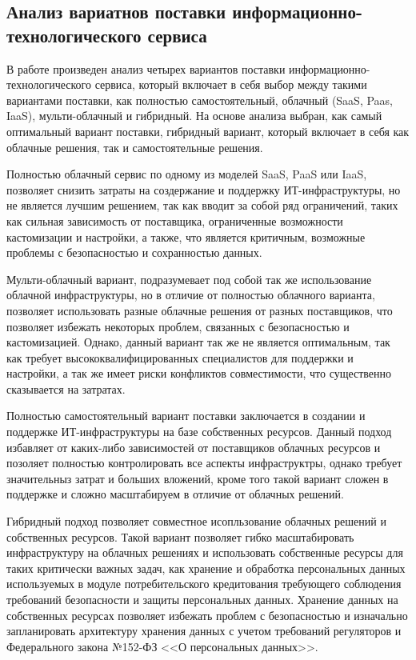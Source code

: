 \documentclass[14pt, a4paper]{extarticle}
\begin{document}
\subsection{Анализ вариатнов поставки информационно-технологического сервиса}

В работе произведен анализ четырех вариантов поставки
информационно-технологического сервиса, который включает в себя выбор между
такими вариантами поставки, как полностью самостоятельный, облачный (SaaS, Paas, IaaS),
мульти-облачный и гибридный. На основе анализа выбран, как самый оптимальный вариант
поставки, гибридный вариант, который включает в себя как облачные решения, так и
самостоятельные решения.

Полностью облачный сервис \cite{micrasoft-azure-book} по одному из моделей SaaS,
PaaS или IaaS, позволяет снизить затраты на создержание и поддержку ИТ-инфраструктуры,
но не является лучшим решением, так как вводит за собой ряд ограничений, таких как
сильная зависимость от поставщика, ограниченные возможности кастомизации и настройки,
а также, что является критичным, возможные проблемы с безопасностью и сохранностью данных.

Мульти-облачный вариант, подразумевает под собой так же использование облачной
инфраструктуры, но в отличие от полностью облачного варианта, позволяет использовать
разные облачные решения от разных поставщиков, что позволяет избежать
некоторых проблем, связанных с безопасностью и кастомизацией. Однако, данный
вариант так же не является оптимальным, так как требует высококвалифицированных
специалистов для поддержки и настройки, а так же имеет риски конфликтов совместимости,
что существенно сказывается на затратах.

Полностью самостоятельный вариант поставки заключается в создании и поддержке
ИТ-инфраструктуры на базе собственных ресурсов. Данный подход избавляет от
каких-либо зависимостей от поставщиков облачных ресурсов и позоляет полностью
контролировать все аспекты инфраструктры, однако требует значительныз затрат и
больших вложений, кроме того такой вариант сложен в поддержке и сложно масштабируем
в отличие от облачных решений.

Гибридный подход позволяет совместное исопльзование облачных решений и собственных
ресурсов. Такой вариант позволяет гибко масштабировать инфраструктуру на облачных
решениях и использовать собственные ресурсы для таких критически важных задач, как
хранение и обработка персональных данных используемых в модуле потребительского
кредитования требующего соблюдения требований безопасности и защиты персональных
данных. Хранение данных на собственных ресурсах позволяет избежать проблем с
безопасностью и изначально запланировать архитектуру хранения данных с учетом
требований регуляторов и Федерального закона №152-ФЗ <<О персональных данных>>.
\end{document}
